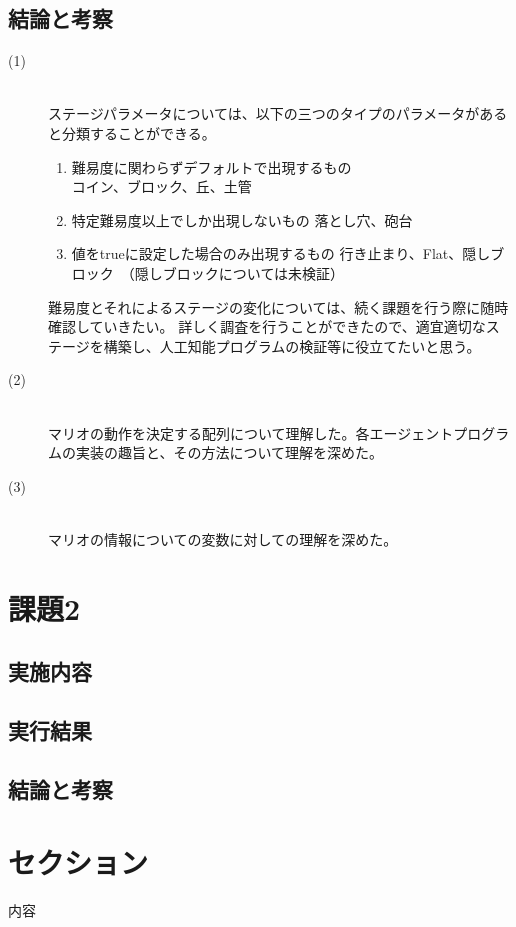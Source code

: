 \documentclass[a4j]{jarticle}
\begin{document}
\subsection{結論と考察}
\begin{description}
\item[(1)]~\\
ステージパラメータについては、以下の三つのタイプのパラメータがあると分類することができる。
\begin{enumerate}
\item 難易度に関わらずデフォルトで出現するもの ~\\
コイン、ブロック、丘、土管
\item 特定難易度以上でしか出現しないもの
落とし穴、砲台
\item 値をtrueに設定した場合のみ出現するもの
行き止まり、Flat、隠しブロック　（隠しブロックについては未検証）
\end{enumerate}

難易度とそれによるステージの変化については、続く課題を行う際に随時確認していきたい。
詳しく調査を行うことができたので、適宜適切なステージを構築し、人工知能プログラムの検証等に役立てたいと思う。

\item[(2)]~\\
マリオの動作を決定する配列について理解した。各エージェントプログラムの実装の趣旨と、その方法について理解を深めた。
\item[(3)]~\\
マリオの情報についての変数に対しての理解を深めた。
\end{description}

\newpage

\section{課題2}
\subsection{実施内容}
\subsection{実行結果}
\subsection{結論と考察}


\section{セクション}
内容
\end{document}
